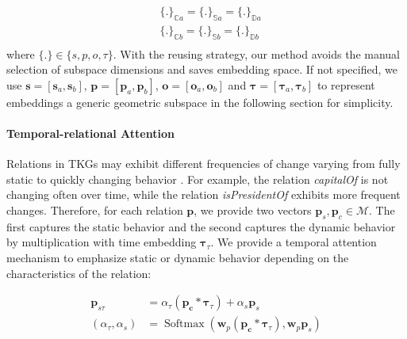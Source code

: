 \documentclass[letterpaper]{article} %
\begin{document}
\begin{equation}
    \begin{split}
        &\{.\}_{\mathbb{C}a}=\{.\}_{\mathbb{S}a}=\{.\}_{\mathbb{D}a}\\
        &\{.\}_{\mathbb{C}b}=\{.\}_{\mathbb{S}b}=\{.\}_{\mathbb{D}b}\\
    \end{split}
\end{equation}
where $\{.\} \in \{s, p, o, \tau \}$. With the reusing strategy, our method avoids the manual selection of subspace dimensions and saves embedding space. If not specified, we use $\boldsymbol{s}=[\boldsymbol{s}_{a},\boldsymbol{s}_{b}]$, $\boldsymbol{p}=[\boldsymbol{p}_{a}, \boldsymbol{p}_{b}]$, $\boldsymbol{o}=[\boldsymbol{o}_{a},\boldsymbol{o}_{b}]$ and $\boldsymbol{\tau}=[\boldsymbol{\tau}_{a},\boldsymbol{\tau}_{b}]$ to represent embeddings a generic geometric subspace in the following section for simplicity.

\paragraph{\textbf{Temporal-relational Attention}}
Relations in TKGs may exhibit different
frequencies of change varying from fully static to quickly changing behavior \cite{tcomplexlacroix2020tensor}. 
For example, the relation \textit{capitalOf} is not changing often over time, while the relation \textit{isPresidentOf} exhibits more frequent changes. 
Therefore, for each relation $\boldsymbol{p}$, we provide two vectors $\boldsymbol{p}_s, \boldsymbol{p}_{c} \in \mathcal{M}$. The first captures the static behavior and the second captures the dynamic behavior by multiplication with time embedding $\boldsymbol{\tau}_\tau$. We provide a temporal attention mechanism to emphasize static or dynamic behavior depending on the characteristics of the relation:

\begin{equation}
\begin{split}
    \boldsymbol{p}_{s\tau} &= \alpha_\tau \left(\boldsymbol{p_c} * \boldsymbol{\tau}_\tau\right) + \alpha_s \boldsymbol{p}_s \\ 
    \left(\alpha_\tau, \alpha_s \right)&=  \operatorname{Softmax}\left(\mathbf{w}_p \left(\boldsymbol{p_c} * \boldsymbol{\tau}_\tau \right) , \mathbf{w}_p \boldsymbol{p}_s \right)
    \label{eq:temporalAttention}
\end{split}
\end{equation}
\end{document}
